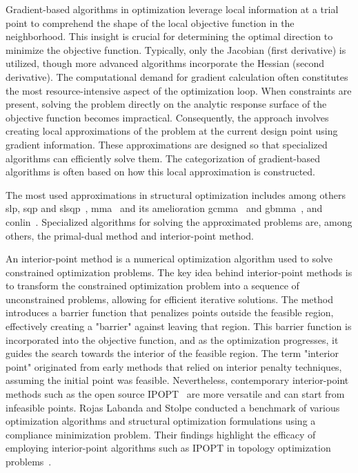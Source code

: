 Gradient-based algorithms in optimization leverage local information at a trial point to comprehend the shape of the local objective function in the neighborhood. This insight is crucial for determining the optimal direction to minimize the objective function. Typically, only the Jacobian (first derivative) is utilized, though more advanced algorithms incorporate the Hessian (second derivative). The computational demand for gradient calculation often constitutes the most resource-intensive aspect of the optimization loop. When constraints are present, solving the problem directly on the analytic response surface of the objective function becomes impractical. Consequently, the approach involves creating local approximations of the problem at the current design point using gradient information. These approximations are designed so that specialized algorithms can efficiently solve them. The categorization of gradient-based algorithms is often based on how this local approximation is constructed.

The most used approximations in structural optimization includes among others \gls{slp}, \gls{sqp} and \gls{slsqp}~, \gls{mma}~ and its amelioration \gls{gcmma}~ and \gls{gbmma}~, and \gls{conlin}~. Specialized algorithms for solving the approximated problems are, among others, the primal-dual method and interior-point method.

An interior-point method is a numerical optimization algorithm used to solve constrained optimization problems. The key idea behind interior-point methods is to transform the constrained optimization problem into a sequence of unconstrained problems, allowing for efficient iterative solutions. The method introduces a barrier function that penalizes points outside the feasible region, effectively creating a "barrier" against leaving that region. This barrier function is incorporated into the objective function, and as the optimization progresses, it guides the search towards the interior of the feasible region. The term "interior point" originated from early methods that relied on interior penalty techniques, assuming the initial point was feasible. Nevertheless, contemporary interior-point methods such as the open source IPOPT~ are more versatile and can start from infeasible points. Rojas Labanda and Stolpe conducted a benchmark of various optimization algorithms and structural optimization formulations using a compliance minimization problem. Their findings highlight the efficacy of employing interior-point algorithms such as IPOPT in topology optimization problems~.


